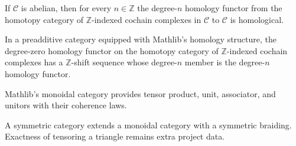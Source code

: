 \begin{theorem}
  \label{thm:mathlib-homotopy-cochain-homology-is-homological}
  \mathlibok
  If $\mathcal C$ is abelian, then for every $n\in\mathbb Z$ the degree-$n$
  homology functor from the homotopy category of $\mathbb Z$-indexed cochain
  complexes in $\mathcal C$ to $\mathcal C$ is homological.
\end{theorem}

\begin{definition}
  \label{def:mathlib-homotopy-cochain-homology-shift-sequence}
  \mathlibok
  In a preadditive category equipped with Mathlib's homology structure, the
  degree-zero homology functor on the homotopy category of $\mathbb Z$-indexed
  cochain complexes has a $\mathbb Z$-shift sequence whose degree-$n$ member is
  the degree-$n$ homology functor.
\end{definition}

\begin{definition}
  \label{def:mathlib-monoidal-category}
  \mathlibok
  Mathlib's monoidal category provides tensor product, unit, associator, and
  unitors with their coherence laws.
\end{definition}

\begin{definition}
  \label{def:mathlib-symmetric-category}
  \mathlibok
  A symmetric category extends a monoidal category with a symmetric braiding.
  Exactness of tensoring a triangle remains extra project data.
\end{definition}

